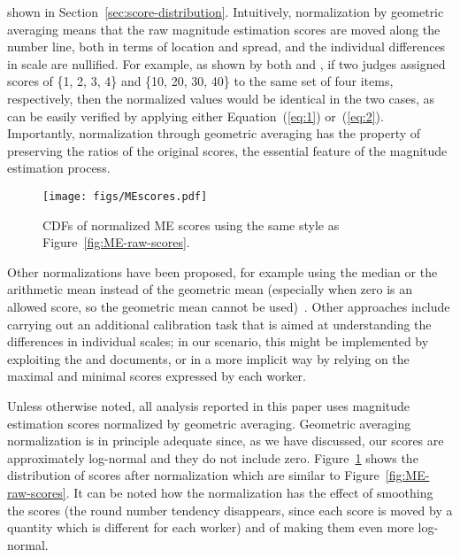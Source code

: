 shown in Section~\ref{sec:score-distribution}. Intuitively,
normalization by geometric averaging means that the raw magnitude
estimation scores are moved along the number line, both in terms of
location and spread, and the individual differences in scale are
nullified.
For example, as shown by both 
\citet{moskowitz:1977} and  
\citet{McG03}, 
if two judges assigned scores of \{1, 2, 3, 4\} and \{10, 20, 30, 40\}
to the same set of four items, respectively, then the normalized values
would be identical in the two cases, as can be easily verified by
applying either Equation~(\ref{eq:1}) or~(\ref{eq:2}).
Importantly, normalization through geometric averaging has the property
of preserving the ratios of the original scores, the essential feature
of the magnitude estimation process.
%
\begin{figure}[tp]
  \centering
  \texttt{[image: figs/MEscores.pdf]}
  \caption{CDFs of normalized ME scores using the
    same style as Figure~\ref{fig:ME-raw-scores}.
  \label{fig:ME-norm-scores}}
\end{figure}

Other normalizations have been proposed, 
for example using the median or the arithmetic mean instead of the
geometric mean (especially when zero is an allowed score, so the
geometric mean cannot be used)~\citep{moskowitz:1977}.
Other approaches include carrying out an additional calibration task
that is aimed at understanding the differences in individual scales;
in our scenario, this might be implemented by exploiting the \nkn and
\hkh documents, or in a more implicit way by relying on the maximal
and minimal scores expressed by each worker.

Unless otherwise noted, all analysis reported in this paper uses
magnitude estimation scores normalized by geometric averaging.
Geometric averaging normalization is in principle adequate since, as
we have discussed, our scores are approximately log-normal and they do
not include zero. 
Figure~\ref{fig:ME-norm-scores} shows the distribution of scores after
normalization which are similar to 
Figure~\ref{fig:ME-raw-scores}.
It can be noted how the normalization has the effect of smoothing the
scores (the round number tendency disappears, since each score is moved by a
quantity which is different for each worker) and of making them even
more log-normal.

